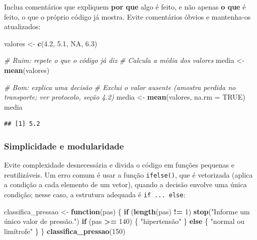 \documentclass[
]{book}
\newenvironment{Shaded}{\begin{snugshade}}{\end{snugshade}}
\newcommand{\AttributeTok}[1]{\textcolor[rgb]{0.13,0.29,0.53}{#1}}
\newcommand{\CommentTok}[1]{\textcolor[rgb]{0.56,0.35,0.01}{\textit{#1}}}
\newcommand{\ConstantTok}[1]{\textcolor[rgb]{0.56,0.35,0.01}{#1}}
\newcommand{\ControlFlowTok}[1]{\textcolor[rgb]{0.13,0.29,0.53}{\textbf{#1}}}
\newcommand{\DecValTok}[1]{\textcolor[rgb]{0.00,0.00,0.81}{#1}}
\newcommand{\FloatTok}[1]{\textcolor[rgb]{0.00,0.00,0.81}{#1}}
\newcommand{\FunctionTok}[1]{\textcolor[rgb]{0.13,0.29,0.53}{\textbf{#1}}}
\newcommand{\NormalTok}[1]{#1}
\newcommand{\OtherTok}[1]{\textcolor[rgb]{0.56,0.35,0.01}{#1}}
\newcommand{\SpecialCharTok}[1]{\textcolor[rgb]{0.81,0.36,0.00}{\textbf{#1}}}
\newcommand{\StringTok}[1]{\textcolor[rgb]{0.31,0.60,0.02}{#1}}
\begin{document}
Inclua comentários que expliquem \textbf{por que} algo é feito, e não apenas \textbf{o que} é feito, o que o próprio código já mostra. Evite comentários óbvios e mantenha-os atualizados:

\begin{Shaded}
\begin{Highlighting}[]
\NormalTok{valores }\OtherTok{\textless{}{-}} \FunctionTok{c}\NormalTok{(}\FloatTok{4.2}\NormalTok{, }\FloatTok{5.1}\NormalTok{, }\ConstantTok{NA}\NormalTok{, }\FloatTok{6.3}\NormalTok{)}

\CommentTok{\# Ruim: repete o que o código já diz}
\CommentTok{\# Calcula a média dos valores}
\NormalTok{media }\OtherTok{\textless{}{-}} \FunctionTok{mean}\NormalTok{(valores)}

\CommentTok{\# Bom: explica uma decisão}
\CommentTok{\# Exclui o valor ausente (amostra perdida no transporte; ver protocolo, seção 4.2)}
\NormalTok{media }\OtherTok{\textless{}{-}} \FunctionTok{mean}\NormalTok{(valores, }\AttributeTok{na.rm =} \ConstantTok{TRUE}\NormalTok{)}
\NormalTok{media}
\end{Highlighting}
\end{Shaded}

\begin{verbatim}
## [1] 5.2
\end{verbatim}

\subsubsection{Simplicidade e modularidade}\label{simplicidade-e-modularidade}

Evite complexidade desnecessária e divida o código em funções pequenas e reutilizáveis. Um erro comum é usar a função \texttt{ifelse()}, que é vetorizada (aplica a condição a cada elemento de um vetor), quando a decisão envolve uma única condição; nesse caso, a estrutura adequada é \texttt{if\ ...\ else}:

\begin{Shaded}
\begin{Highlighting}[]
\NormalTok{classifica\_pressao }\OtherTok{\textless{}{-}} \ControlFlowTok{function}\NormalTok{(pas) \{}
  \ControlFlowTok{if}\NormalTok{ (}\FunctionTok{length}\NormalTok{(pas) }\SpecialCharTok{!=} \DecValTok{1}\NormalTok{) }\FunctionTok{stop}\NormalTok{(}\StringTok{"Informe um único valor de pressão."}\NormalTok{)}
  \ControlFlowTok{if}\NormalTok{ (pas }\SpecialCharTok{\textgreater{}=} \DecValTok{140}\NormalTok{) \{}
    \StringTok{"hipertensão"}
\NormalTok{  \} }\ControlFlowTok{else}\NormalTok{ \{}
    \StringTok{"normal ou limítrofe"}
\NormalTok{  \}}
\NormalTok{\}}
\FunctionTok{classifica\_pressao}\NormalTok{(}\DecValTok{150}\NormalTok{)}
\end{Highlighting}
\end{Shaded}
\end{document}
